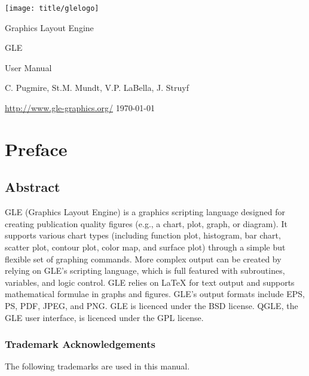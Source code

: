 \thispagestyle{empty}
\begin{center}
\texttt{[image: title/glelogo]}

{\Huge Graphics Layout Engine}

\vspace{1cm}

{\huge GLE \gleversion{}}

\vspace{1cm}

{\huge User Manual}

\vspace{1cm}

C. Pugmire, St.M. Mundt, V.P. LaBella, J. Struyf

\vspace{1cm}

\url{http://www.gle-graphics.org/}
\vfill
\today{}
\end{center}


\tableofcontents

\chapter{Preface}

\section*{Abstract}

GLE (Graphics Layout Engine) is a graphics scripting language designed for creating publication quality figures (e.g., a chart, plot, graph, or diagram). It supports various chart types (including function plot, histogram, bar chart, scatter plot, contour plot, color map, and surface plot) through a simple but flexible set of graphing commands. More complex output can be created by relying on GLE's scripting language, which is full featured with subroutines, variables, and logic control. GLE relies on \LaTeX{} for text output and supports mathematical formulae in graphs and figures. GLE's output formats include EPS, PS, PDF, JPEG, and PNG. GLE is licenced under the BSD license. QGLE, the GLE user interface, is licenced under the GPL license.

\subsection*{Trademark Acknowledgements}
The following trademarks are used in this manual.

